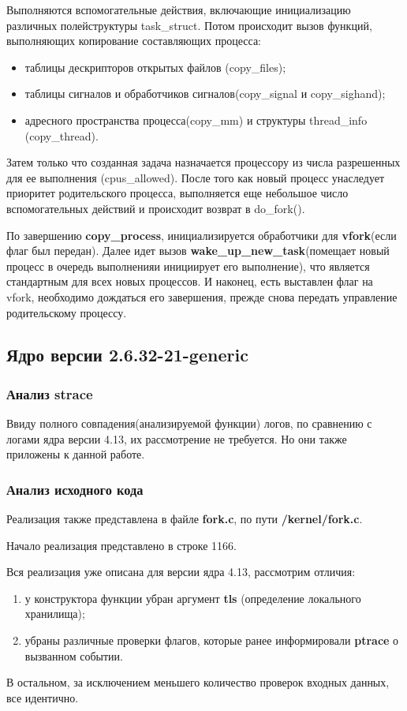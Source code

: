 Выполняются вспомогательные действия, включающие инициализацию различных полейструктуры task\_struct. Потом происходит вызов функций, выполняющих копирование составляющих процесса: 
\begin{itemize}
\item таблицы дескрипторов открытых файлов (copy\_files);
\item таблицы сигналов и обработчиков сигналов(copy\_signal и copy\_sighand);
\item адресного пространства процесса(copy\_mm) и структуры thread\_info (copy\_thread).
\end{itemize}
Затем только что созданная задача назначается процессору из числа разрешенных для ее выполнения (cpus\_allowed). После того как новый процесс унаследует приоритет родительского процесса, выполняется еще небольшое число вспомогательных действий и происходит возврат в do\_fork().


По завершению \textbf{copy\_process}, инициализируется обработчики для \textbf{vfork}(если флаг был передан). Далее идет вызов \textbf{wake\_up\_new\_task}(помещает новый процесс в очередь выполненияи инициирует его выполнение), что является стандартным для всех новых процессов. И наконец, есть выставлен флаг на vfork, необходимо дождаться его завершения, прежде снова передать управление родительскому процессу.


\subsection{Ядро версии 2.6.32-21-generic}
\subsubsection{Анализ strace}
Ввиду полного совпадения(анализируемой функции) логов, по сравнению с логами ядра версии 4.13, их рассмотрение не требуется. Но они также приложены к данной работе.

\subsubsection{Анализ исходного кода}
Реализация также представлена в файле \textbf{fork.c}, по пути \textbf{/kernel/fork.c}.

Начало реализация представлено в строке 1166.

Вся реализация уже описана для версии ядра 4.13, рассмотрим отличия:
\begin{enumerate}
\item у конструктора функции убран аргумент \textbf{tls} (определение локального хранилища);
\item убраны различные проверки флагов, которые ранее информировали \textbf{ptrace} о вызванном событии.
\end{enumerate}
В остальном, за исключением меньшего количество проверок входных данных, все идентично.

